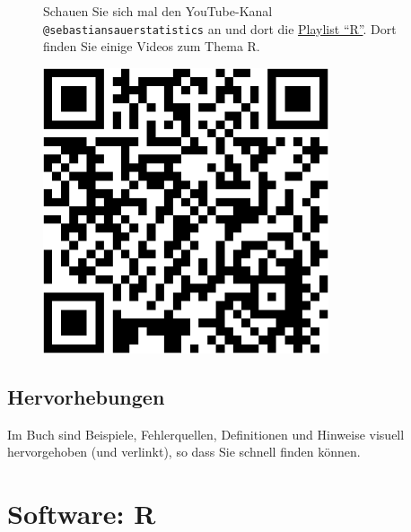 \documentclass[
  a4paper,
]{scrbook}
\theoremstyle{definition}
\theoremstyle{definition}
\theoremstyle{definition}
\theoremstyle{remark}
\begin{document}
\begin{figure}

\begin{minipage}{0.80\linewidth}
Schauen Sie sich mal den YouTube-Kanal
\texttt{@sebastiansauerstatistics} an und dort die
\href{https://www.youtube.com/playlist?list=PLRR4REmBgpIEaIyeNBgNGPgmhQJ_T1y8_}{Playlist
``R''}. Dort finden Sie einige Videos zum Thema R.\end{minipage}%
%
\begin{minipage}{0.20\linewidth}

\begin{center}
\includegraphics[width=0.75\textwidth,height=\textheight]{index_files/figure-pdf/unnamed-chunk-4-1.pdf}
\end{center}

\end{minipage}%

\end{figure}%

\subsection{Hervorhebungen}\label{hervorhebungen}

Im Buch sind Beispiele, Fehlerquellen, Definitionen und Hinweise visuell
hervorgehoben (und verlinkt), so dass Sie schnell finden können.

\section{Software: R}\label{software-r}
\end{document}
